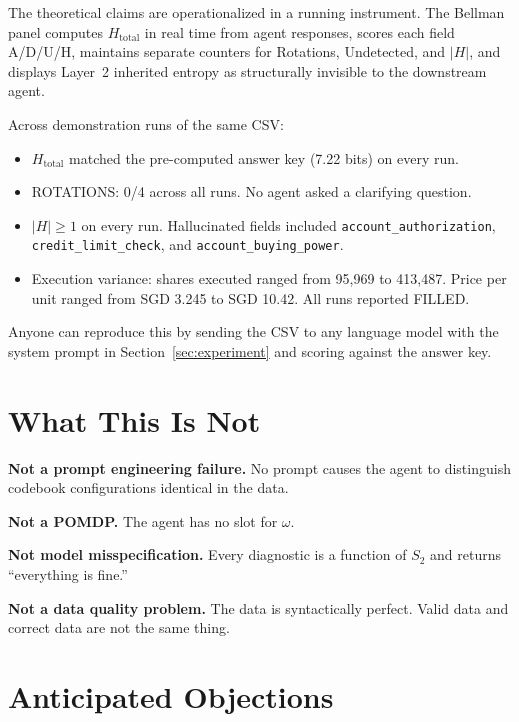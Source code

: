 \documentclass[11pt,a4paper]{article}
\begin{document}
The theoretical claims are operationalized in a running instrument. 
The Bellman panel computes $H_{\text{total}}$ in real time from 
agent responses, scores each field A/D/U/H, maintains separate 
counters for Rotations, Undetected, and $|H|$, and displays 
Layer~2 inherited entropy as structurally invisible to the 
downstream agent.

Across demonstration runs of the same CSV:

\begin{itemize}
    \item $H_{\text{total}}$ matched the pre-computed answer key 
    (7.22 bits) on every run.
    \item ROTATIONS: 0/4 across all runs. No agent asked a 
    clarifying question.
    \item $|H| \geq 1$ on every run. Hallucinated fields included 
    \texttt{account\_authorization}, \texttt{credit\_limit\_check}, 
    and \texttt{account\_buying\_power}.
    \item Execution variance: shares executed ranged from 95,969 to 
    413,487. Price per unit ranged from SGD 3.245 to SGD 10.42. All 
    runs reported FILLED.
\end{itemize}

Anyone can reproduce this by sending the CSV to any language model 
with the system prompt in Section~\ref{sec:experiment} and scoring 
against the answer key.


\section{What This Is Not}

\textbf{Not a prompt engineering failure.} No prompt causes the 
agent to distinguish codebook configurations identical in the data.

\textbf{Not a POMDP.} The agent has no slot for $\omega$.

\textbf{Not model misspecification.} Every diagnostic is a function 
of $S_2$ and returns ``everything is fine.''

\textbf{Not a data quality problem.} The data is syntactically 
perfect. Valid data and correct data are not the same thing.


\section{Anticipated Objections}
\label{sec:objections}
\end{document}
